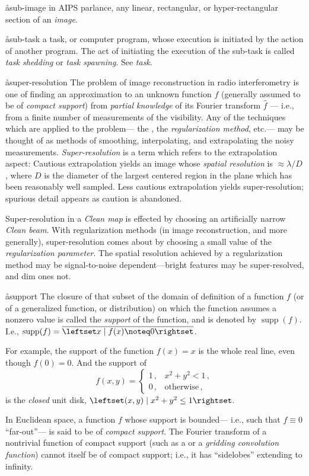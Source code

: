 \aa{sub-image}
in AIPS parlance, any linear, rectangular, or hyper-rectangular
section of an {\it image}.

\aa{sub-task}
a task, or computer program, whose execution is initiated by
the action of another program.
The act of initiating the execution of the sub-task is called
{\it task shedding} or {\it task spawning}.
See {\it task}.

\aa{super-resolution}
The problem of image reconstruction in radio interferometry
is one of finding an approximation to
an unknown function $f$ (generally assumed to be of {\it compact
support}\/) from {\sl partial knowledge} of its
Fourier transform $\hat f$ --- i.e., from a finite number of
measurements of the visibility.
Any of the techniques which are applied to the problem---%
the \hca\/, the {\it regularization method}\/, etc.---%
may be thought of as methods of smoothing, interpolating, and
extrapolating the noisy measurements.
{\it Super-resolution} is a term which refers to the extrapolation
aspect:
Cautious extrapolation yields an image whose {\it spatial resolution}
is $\approx\lambda/D$, where $D$ is the diameter of the largest
centered region in the \uv plane which has been reasonably well sampled.
Less cautious extrapolation yields super-resolution;
spurious detail appears as caution is abandoned.
\par
Super-resolution in a {\it Clean map} is effected by choosing
an artificially narrow {\it Clean beam}.
With regularization methods (in image reconstruction, and more generally),
super-resolution comes about
by choosing a small value of the {\it regularization parameter}.
The spatial resolution achieved by a regularization method
may be signal-to-noise dependent---bright features may be
super-resolved, and dim ones not.

\aa{support}
The closure of that subset of the domain of definition of a function $f$
(or of a generalized function, or distribution)
on which the function assumes a nonzero value is called the
{\it support} of the function, and is denoted by $\operatorname{supp}(f)$.
I.e., $\operatorname{supp}(f)=\overline{\leftset x\mid f(x)\noteq0\rightset}$.
\par
For example, the support of the function $f(x)=x$ is the
whole real line, even though $f(0)=0$.
And the support of
$$f(x,y)=\left\{ \begin{array}{ll}
1\,,&x^2+y^2<1\,,\\0\,,&\text{otherwise}\,,
\end{array}\right.$$
is the {\it closed} unit disk, $\leftset(x,y)\mid x^2+y^2\le1\rightset$.
\par
In Euclidean space, a function $f$ whose support is bounded---%
i.e., such that $f\equiv0$ ``far-out''---%
is said to be of {\it compact support}.
The Fourier transform of a nontrivial function of compact support
(such as a 
or a {\it gridding convolution function}\/)
cannot itself be of compact support;
i.e., it has ``sidelobes'' extending to infinity.


